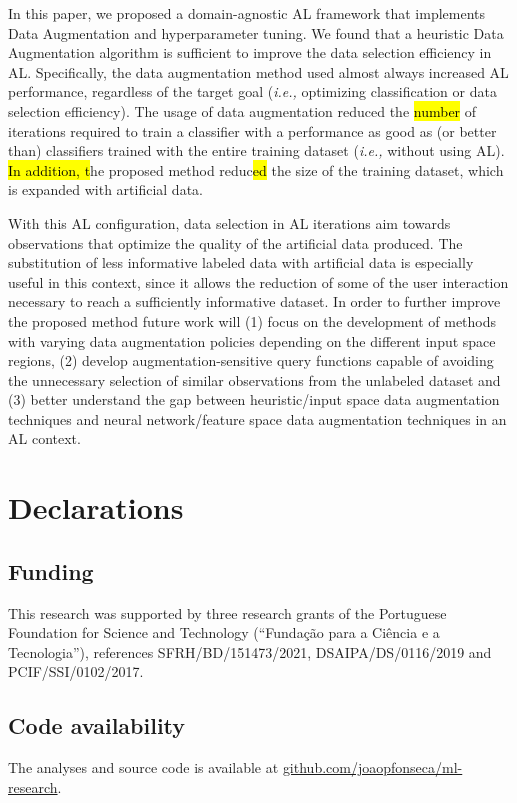 \documentclass[preprint, 12pt]{elsarticle}
\begin{document}
In this paper, we proposed a domain-agnostic AL framework that implements Data
Augmentation and hyperparameter tuning. We found that a heuristic Data
Augmentation algorithm is sufficient to improve the data
selection efficiency in AL\@. Specifically, the data augmentation method used
almost always increased AL performance, regardless of the target goal
(\textit{i.e.,} optimizing classification or data selection efficiency). The
usage of data augmentation reduced the \hl{number} of iterations required to
train a classifier with a performance as good as (or better than) classifiers
trained with the entire training dataset (\textit{i.e.,} without using AL).
\hl{In addition, t}he proposed method reduc\hl{ed} the size of the training
dataset, which is expanded with artificial data. 

With this AL configuration, data selection in AL iterations aim towards
observations that optimize the quality of the artificial data produced. The
substitution of less informative labeled data with artificial data is
especially useful in this context, since it allows the reduction of some of
the user interaction necessary to reach a sufficiently informative dataset.
In order to further improve the proposed method future work will (1) focus on
the development of methods with varying data augmentation policies depending
on the different input space regions, (2) develop augmentation-sensitive query
functions capable of avoiding the unnecessary selection of similar
observations from the unlabeled dataset and (3) better understand the gap
between heuristic/input space data augmentation techniques and neural
network/feature space data augmentation techniques in an AL context.

\section*{Declarations}

\subsection*{Funding}

This research was supported by three research grants of the Portuguese Foundation
for Science and Technology (``Fundação para a Ciência e a Tecnologia''),
references SFRH/BD/151473/2021, DSAIPA/DS/0116/2019 and PCIF/SSI/0102/2017.

\subsection*{Code availability}

The analyses and source code is available at
\href{https://github.com/joaopfonseca/ml-research}{github.com/joaopfonseca/ml-research}.



\end{document}
